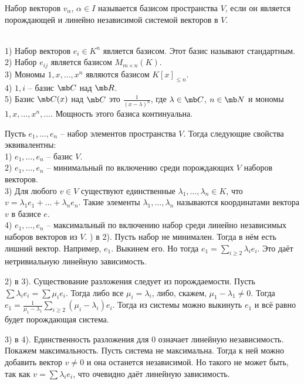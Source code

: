\dfn[Базис] Набор векторов $v_{\alpha}$, $\alpha \in I$ называется базисом пространства $V$, если он является порождающей и линейно независимой системой векторов в $V$. \edfn

\exm\\
1) Набор векторов $e_i \in K^n$ является базисом. Этот базис называют стандартным.\\
2) Набор $e_{ij}$ является базисом $M_{m\times n}(K)$.\\
3) Мономы $1,x, \dots, x^n$ являются базисом $K[x]_{\leq n}$.\\
4) $1,i$ -- базис $\mb C$ над $\mb R$.\\
5) Базис $\mb C(x)$ над $\mb C$ это $\frac{1}{(x-\lambda)^n}$, где $\lambda \in \mb C$, $n\in\mb N$ и мономы $1,x,\dots, x^n, \dots$. Мощность этого базиса континуальна.








\lm[Переформулировки] Пусть $e_1,\dots,e_n$ -- набор элементов пространства $V$.
Тогда следующие свойства эквивалентны: \\
1) $e_1,\dots,e_n$ -- базис $V$.\\
2) $e_1,\dots,e_n$ -- минимальный по включению среди порождающих $V$ наборов векторов.\\
3) Для любого $v\in V$ существуют единственные $\lambda_1,\dots,\lambda_n \in K$, что $v=\lambda_1e_1+\dots+\lambda_ne_n$. Такие элементы $\lambda_1,\dots,\lambda_n$ называются координатами вектора $v$ в базисе $e$.\\
4) $e_1,\dots,e_n$ -- максимальный по включению набор среди линейно независимых наборов векторов из $V$.
)  в 2). Пусть набор не минимален. Тогда в нём есть лишний вектор. Например, $e_1$. Выкинем его. Но тогда $e_1=\sum_{i\geq 2}\lambda_i e_i$. Это даёт нетривиальную линейную зависимость.

2) в 3). Существование разложения следует из порождаемости. Пусть $\sum \lambda_i e_i =\sum \mu_i e_i$. Тогда либо все $\mu_i=\lambda_i$, либо, скажем, $\mu_1-\lambda_1 \neq 0$. Тогда  $e_1=\frac{1}{\mu_1-\lambda_1}\sum_{i\geq 2} (\mu_i-\lambda_i) e_i$. Тогда из системы можно выкинуть $e_1$ и всё равно будет порождающая система.

3) в 4). Единственность разложения для 0 означает линейную независимость. Покажем максимальность. Пусть система не максимальна. Тогда к ней можно добавить вектор $v\neq 0$ и она останется независимой. Но такого не может быть, так как $v=\sum \lambda_i e_i$, что очевидно даёт линейную зависимость.

